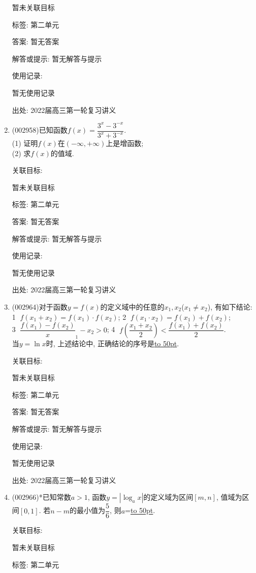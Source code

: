 \documentclass[10pt,a4paper]{article}
\newcommand{\blank}[1]{\underline{\hbox to #1pt{}}}
\begin{document}
\begin{enumerate}[1.]
暂未关联目标



标签: 第二单元

答案: 暂无答案

解答或提示: 暂无解答与提示

使用记录:

暂无使用记录


出处: 2022届高三第一轮复习讲义
\item { (002958)}已知函数$f(x)=\dfrac{3^x-3^{-x}}{3^x+3^{-x}}$.\\
(1) 证明$f(x)$在$(-\infty,+\infty)$上是增函数;\\
(2) 求$f(x)$的值域.


关联目标:

暂未关联目标



标签: 第二单元

答案: 暂无答案

解答或提示: 暂无解答与提示

使用记录:

暂无使用记录


出处: 2022届高三第一轮复习讲义
\item { (002964)}对于函数$y=f(x)$的定义域中的任意的$x_1,x_2$($x_1\ne x_2$), 有如下结论:\\
\textcircled{1} $f(x_1+x_2)=f(x_1)\cdot f(x_2)$; \textcircled{2} $f(x_1\cdot x_2)=f(x_1)+f(x_2)$;\\ \textcircled{3} $\dfrac{f(x_1)-f(x_2)}x_1-x_2>0$; \textcircled{4} $f(\dfrac{x_1+x_2}2)<\dfrac{f(x_1)+f(x_2)}2$. 
\\当$y=\ln x$时, 上述结论中, 正确结论的序号是\blank{50}.


关联目标:

暂未关联目标



标签: 第二单元

答案: 暂无答案

解答或提示: 暂无解答与提示

使用记录:

暂无使用记录


出处: 2022届高三第一轮复习讲义
\item { (002966)}*已知常数$a>1$, 函数$y=|\log_ax|$的定义域为区间$[m,n]$, 值域为区间$[0,1]$. 若$n-m$的最小值为$\dfrac 56$, 则$a$=\blank{50}.


关联目标:

暂未关联目标



标签: 第二单元


\end{enumerate}
\end{document}
